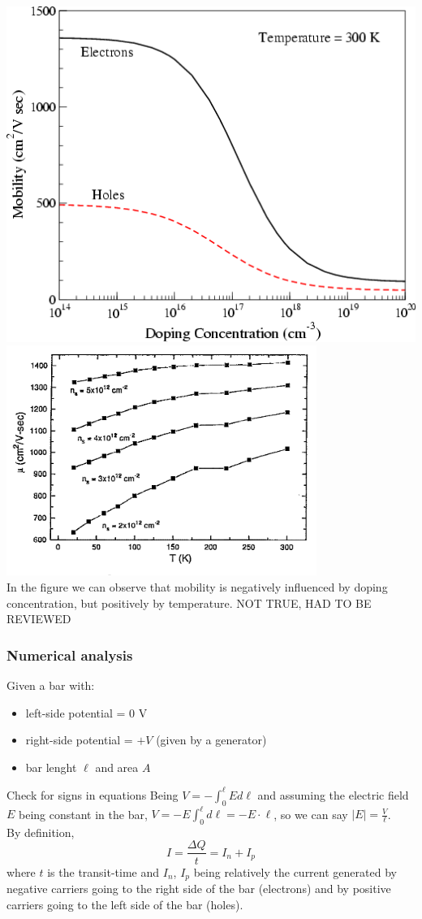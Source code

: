 \documentclass[12pt]{article}
\begin{document}
\begin{center}
	\includegraphics[width=7 cm]{mob.png}
	\includegraphics[width=7 cm]{mobilityT} %
	\\
	In the figure we can observe that mobility is negatively influenced by doping  concentration, but positively by temperature.
	NOT TRUE, HAD TO BE REVIEWED 
\end{center}

\subsubsection{Numerical analysis}
Given a bar with:
\begin{itemize}
	\item left-side potential = 0 V
	\item right-side potential = $+V$ (given by a generator)
	\item bar lenght $\ell$ and area $A$
\end{itemize}
 Check for signs in equations
Being $V = -\int_{0}^{\ell}Ed\ell$ and assuming the electric field $E$ being constant in the bar, $V = -E\int_{0}^{\ell}d\ell = -E\cdot{\ell}$, so we can say $|E| = \frac{V}{\ell}$.\\
By definition,
\begin{equation}
	I = \frac{\Delta Q}{t} = I_n + I_p
\end{equation} where $t$ is the transit-time and $I_n$, $I_p$ being relatively the current generated by negative carriers going to the right side of the bar (electrons) and by positive carriers going to the left side of the bar (holes). 
\end{document}
